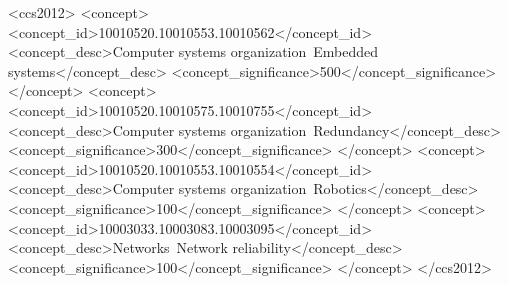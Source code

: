 \documentclass[acmlarge]{acmart}
\begin{document}
\begin{CJK*}{UTF8}{gbsn}
\begin{CCSXML}
<ccs2012>
 <concept>
  <concept_id>10010520.10010553.10010562</concept_id>
  <concept_desc>Computer systems organization~Embedded systems</concept_desc>
  <concept_significance>500</concept_significance>
 </concept>
 <concept>
  <concept_id>10010520.10010575.10010755</concept_id>
  <concept_desc>Computer systems organization~Redundancy</concept_desc>
  <concept_significance>300</concept_significance>
 </concept>
 <concept>
  <concept_id>10010520.10010553.10010554</concept_id>
  <concept_desc>Computer systems organization~Robotics</concept_desc>
  <concept_significance>100</concept_significance>
 </concept>
 <concept>
  <concept_id>10003033.10003083.10003095</concept_id>
  <concept_desc>Networks~Network reliability</concept_desc>
  <concept_significance>100</concept_significance>
 </concept>
</ccs2012>
\end{CCSXML}



\maketitle











\end{CJK*}
\end{document}
